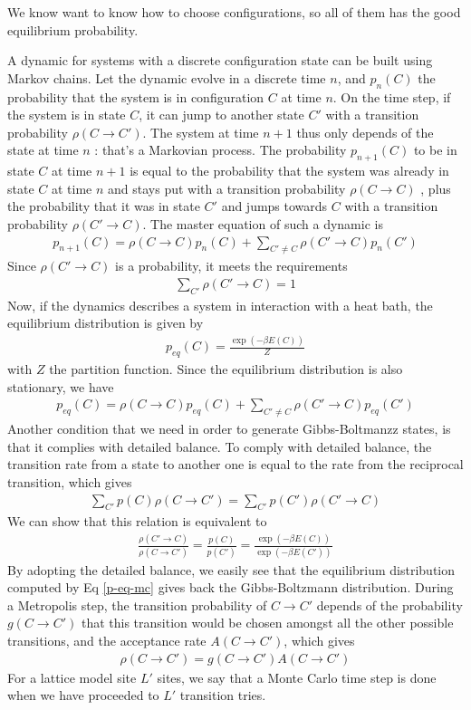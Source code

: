 We know want to know how to choose configurations, so all of them has the good equilibrium probability.

A dynamic for systems with a discrete configuration state can be built using Markov chains. Let the dynamic evolve in a discrete time $n$, and $p_n(C)$ the probability that the system is in configuration $C$ at time $n$. On the time step, if the system is in state $C$, it can jump to another state $C'$ with a transition probability $\rho(C\to C')$. The system at time $n+1$ thus only depends of the state at time $n$ : that's a Markovian process. The probability $p_{n+1}(C)$ to be in state $C$ at time $n+1$ is equal to the probability that the system was already in state $C$ at time $n$ and stays put with a transition probability $\rho(C\to C)$ , plus the probability that it was in state $C'$ and jumps towards $C$ with a transition probability $\rho(C'\to C)$. The master equation of such a dynamic is
\begin{align}
p_{n+1}(C) = \rho(C\to C) p_n(C) + \sum_{C'\neq C} \rho(C'\to C) p_n(C')
\end{align}
Since $\rho(C' \to C)$ is a probability, it meets the requirements 
\begin{align}
\sum_{C'} \rho(C' \to C) = 1
\label{norm}
\end{align}
Now, if the dynamics describes a system in interaction with a heat bath, the equilibrium distribution is given by
\begin{align}
p_{eq}(C) = \frac{\exp(-\beta E(C))}{Z}
\end{align}
with $Z$ the partition function. Since the equilibrium distribution is also stationary, we have
\begin{align}
p_{eq}(C) = \rho(C\to C) p_{eq}(C) + \sum_{C'\neq C} \rho(C'\to C)p_{eq}(C')
\label{p-eq-mc}
\end{align}
Another condition that we need in order to generate Gibbs-Boltmanzz states, is that it complies with detailed balance. To comply with detailed balance, the transition rate from a state to another one is equal to the rate from the reciprocal transition, which gives
\begin{align}
\sum_{C'} p(C) \rho(C \to C') = \sum_{C'} p(C') \rho(C' \to C)
\end{align}
We can show that this relation is equivalent to \cite{newman_monte_1999} 
\begin{align}
\frac{\rho(C'\to C)}{\rho(C \to C')} = \frac{p(C)}{p(C')} = \frac{\exp(-\beta E(C))}{\exp(-\beta E(C'))}
\end{align} 
By adopting the detailed balance, we easily see that the equilibrium distribution computed by Eq \eqref{p-eq-mc} gives back the Gibbs-Boltzmann distribution. 
During a Metropolis step, the transition probability of $C\to C'$ depends of the probability $g(C\to C')$ that this transition would be chosen amongst all the other possible transitions, and the acceptance rate ${A(C \to C')}$, which gives
\begin{align}
    \rho(C\to C') = g(C\to C') A(C \to C')
    \label{acceptance-mc}
\end{align}
For a lattice model site $L'$ sites, we say that a Monte Carlo time step is done when we have proceeded to $L'$ transition tries.
